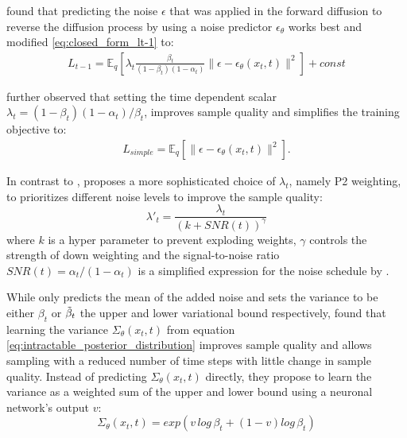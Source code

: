 \cite{ho_denoising_2020} found that predicting the noise $\epsilon$ that was applied in the forward diffusion to reverse the diffusion process by using a noise predictor $\epsilon_{\theta}$ works best and modified \eqref{eq:closed_form_lt-1} to:
\begin{equation}
\begin{aligned}
L_{t-1} = \mathbb{E}_{q}\left[\lambda_t\frac{\beta_t}{\left(1-\beta_t\right)\left(1-\alpha_t\right)}\|\epsilon-\epsilon_{\theta}\left(x_t,t\right)\|^2\right] + const
\end{aligned}
\end{equation}

\cite{ho_denoising_2020} further observed that setting the time dependent scalar $\lambda_t=\left(1-\beta_t\right)\left(1-\alpha_t\right)/\beta_t$, improves sample quality and simplifies the training objective to:
\begin{equation}
\label{eq:loss_simple}
\begin{aligned}
L_{simple} = \mathbb{E}_{q}\left[\|\epsilon-\epsilon_{\theta}\left(x_t,t\right)\|^2\right].
\end{aligned}
\end{equation}

In contrast to \cite{ho_denoising_2020}, \cite{choi_perception_2022} proposes a more sophisticated choice of $\lambda_t$, namely P2 weighting, to prioritizes different noise levels to improve the sample quality:
\begin{equation}
\lambda'_t = \frac{\lambda_t}{\left(k+SNR(t)\right)^{\gamma}}
\end{equation}
where $k$ is a hyper parameter to prevent exploding weights, $\gamma$ controls the strength of down weighting and the signal-to-noise ratio $SNR(t)=\alpha_t/(1-\alpha_t)$ is a simplified expression for the noise schedule by \cite{kingma_variational_2022}.

While \cite{ho_denoising_2020} only predicts the mean of the added noise and sets the variance to be either $\beta_t$ or $\Tilde{\beta}_t$ the upper and lower variational bound respectively, \cite{nichol_improved_2021} found that learning the variance $\Sigma_{\theta}\left(x_t,t\right)$ from equation \eqref{eq:intractable_posterior_distribution} improves sample quality and allows sampling with a reduced number of time steps with little change in sample quality. Instead of predicting $\Sigma_{\theta}\left(x_t,t\right)$ directly, they propose to learn the variance as a weighted sum of the upper and lower bound using a neuronal network's output $v$:
\begin{equation}
\Sigma_{\theta}\left(x_t,t\right) = exp\left(v\,log\,\beta_t+\left(1-v\right)log\,\beta_t\right)
\end{equation}

